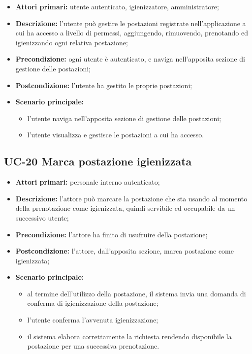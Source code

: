 \begin{itemize}
\item \textbf{Attori primari:} utente autenticato, igienizzatore, amministratore;
\item \textbf{Descrizione:} l’utente può gestire le postazioni registrate nell’applicazione a cui ha accesso a livello di permessi, aggiungendo, rimuovendo, prenotando ed igienizzando ogni relativa postazione;
\item \textbf{Precondizione:} ogni utente è autenticato, e naviga nell’apposita sezione di gestione delle postazioni;
\item \textbf{Postcondizione:} l’utente ha gestito le proprie postazioni;
\item \textbf{Scenario principale:} 
	\begin{itemize}
		\item l’utente naviga nell’apposita sezione di gestione delle postazioni;
		\item l’utente visualizza e gestisce le postazioni a cui ha accesso.
	\end{itemize}
\end{itemize}


\subsection{UC-20 Marca postazione igienizzata}

\begin{itemize}
\item \textbf{Attori primari:} personale interno autenticato;
\item \textbf{Descrizione:} l'attore può marcare la postazione che sta usando al momento della prenotazione come igienizzata, quindi servibile ed occupabile da un successivo utente;
\item \textbf{Precondizione:} l'attore ha finito di usufruire della postazione; 
\item \textbf{Postcondizione:} l’attore, dall'apposita sezione, marca postazione come igienizzata;
\item \textbf{Scenario principale:} 
	\begin{itemize}
		\item al termine dell'utilizzo della postazione, il sistema invia una domanda di conferma di igienizzazione della postazione;		
		\item l’utente conferma l'avvenuta igienizzazione;
		\item il sistema elabora correttamente la richiesta rendendo disponibile la postazione per una successiva prenotazione.
	\end{itemize}
\end{itemize}

